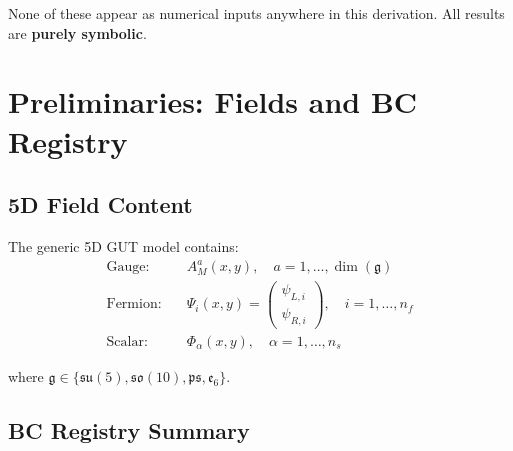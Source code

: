 \documentclass[11pt,a4paper]{article}
\begin{document}
None of these appear as numerical inputs anywhere in this derivation.
All results are \textbf{purely symbolic}.

\section{Preliminaries: Fields and BC Registry}
\label{sec:prelim}

\subsection{5D Field Content}

The generic 5D GUT model contains:
\begin{align}
\label{eq:5d-gauge}
\text{Gauge:} \quad & A_M^a(x, y), \quad a = 1, \ldots, \dim(\mathfrak{g}) \\
\label{eq:5d-fermion}
\text{Fermion:} \quad & \Psi_i(x, y) = \begin{pmatrix} \psi_{L,i} \\ \psi_{R,i} \end{pmatrix}, \quad i = 1, \ldots, n_f \\
\label{eq:5d-scalar}
\text{Scalar:} \quad & \Phi_\alpha(x, y), \quad \alpha = 1, \ldots, n_s
\end{align}

where $\mathfrak{g} \in \{\mathfrak{su}(5), \mathfrak{so}(10), \mathfrak{ps}, \mathfrak{e}_6\}$.

\subsection{BC Registry Summary}
\end{document}
